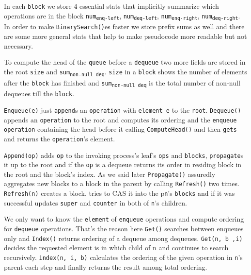 \documentclass[10pt]{article}
\theoremstyle{definition}
\begin{document}
In each \texttt{block} we store 4 essential stats that implicitly summarize which operations are in the block \texttt{num\textsubscript{enq-left}}, \texttt{num\textsubscript{deq-left}}, \texttt{num\textsubscript{enq-right}}, \texttt{num\textsubscript{deq-right}}. In order to make \texttt{BinarySearch()}es faster we store prefix sums as well and there are some more general stats that help to make pseudocode more readable but not necessary.

To compute the head of the \texttt{queue} before a \texttt{dequeue} two more fields are stored in the root \texttt{size} and \texttt{sum\textsubscript{non-null deq}}. \texttt{size} in a \texttt{block} shows the number of elements after the \texttt{block} has finished and \texttt{sum\textsubscript{non-null deq}} is the total number of non-null dequeues till the \texttt{block}.

\texttt{Enqueue(e)} just \texttt{append}s an \texttt{operation} with \texttt{element e} to the \texttt{root}. \texttt{Dequeue()} appends an \texttt{operation} to the root and computes its ordering and the \texttt{enqueue operation} containing the head before it calling \texttt{ComputeHead()} and then \texttt{gets} and returns the \texttt{operation}'s element.

\texttt{Append(op)} adds \texttt{op} to the invoking process's leaf's \texttt{ops} and \texttt{blocks}, \texttt{propagate}s it up to the root and if the \texttt{op} is a dequeue returns its order in residing block in the root and the block's index. As we said later \texttt{Propagate()} assuredly aggregates new blocks to a block in the parent by calling \texttt{Refresh()} two times. \texttt{Refresh(n)} creates a block, tries to CAS it into the p\texttt{n}'s \texttt{blocks} and if it was successful updates \texttt{super} and \texttt{counter} in both of \texttt{n}'s children.

We only want to know the \texttt{element} of \texttt{enqueue} operations and compute ordering for \texttt{dequeue} operations. That's the reason here \texttt{Get()} searches between enqueues only and \texttt{Index()} returns ordering of a dequeue among dequeues. \texttt{Get(n, b ,i)} decides the requested element is in which child of n and continues to search recursively. \texttt{index(n, i, b)} calculates the ordering of the given operation in \texttt{n}'s parent each step and finally returns the result among total ordering.

\pagebreak
\newpage
{}
\end{document}
